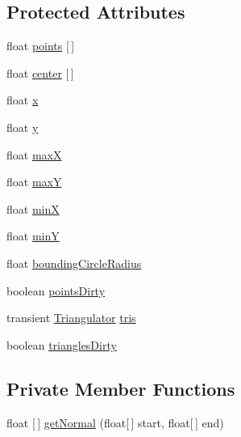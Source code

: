 \subsection*{Protected Attributes}
\begin{DoxyCompactItemize}
\item 
float \mbox{\hyperlink{classorg_1_1newdawn_1_1slick_1_1geom_1_1_shape_a8b4d4058734bbb3b96072e470b92aa37}{points}} \mbox{[}$\,$\mbox{]}
\item 
float \mbox{\hyperlink{classorg_1_1newdawn_1_1slick_1_1geom_1_1_shape_a15ecde3336c4310cd927d766bb9a0b3b}{center}} \mbox{[}$\,$\mbox{]}
\item 
float \mbox{\hyperlink{classorg_1_1newdawn_1_1slick_1_1geom_1_1_shape_a3e985bfff386c15a4efaad03d8ad60d3}{x}}
\item 
float \mbox{\hyperlink{classorg_1_1newdawn_1_1slick_1_1geom_1_1_shape_a9f934baded6a1b65ebb69e7e5f80ea00}{y}}
\item 
float \mbox{\hyperlink{classorg_1_1newdawn_1_1slick_1_1geom_1_1_shape_a8c820b5a7df465beab7f021cdd09b826}{maxX}}
\item 
float \mbox{\hyperlink{classorg_1_1newdawn_1_1slick_1_1geom_1_1_shape_aaacbabfb1b7d0653f59658d92ded1c2b}{maxY}}
\item 
float \mbox{\hyperlink{classorg_1_1newdawn_1_1slick_1_1geom_1_1_shape_a5bd07629e85d4a15fc03e3d60edb7c03}{minX}}
\item 
float \mbox{\hyperlink{classorg_1_1newdawn_1_1slick_1_1geom_1_1_shape_a4794592d5238a8c51d9d8ac4a11e68d4}{minY}}
\item 
float \mbox{\hyperlink{classorg_1_1newdawn_1_1slick_1_1geom_1_1_shape_ac89bf2b9c93a7294b49797fc7a054c11}{bounding\+Circle\+Radius}}
\item 
boolean \mbox{\hyperlink{classorg_1_1newdawn_1_1slick_1_1geom_1_1_shape_a61fe1954d2fdefc72c34b284f4fcfdb4}{points\+Dirty}}
\item 
transient \mbox{\hyperlink{interfaceorg_1_1newdawn_1_1slick_1_1geom_1_1_triangulator}{Triangulator}} \mbox{\hyperlink{classorg_1_1newdawn_1_1slick_1_1geom_1_1_shape_abd907aa2c7a270db435ed15ce6d090da}{tris}}
\item 
boolean \mbox{\hyperlink{classorg_1_1newdawn_1_1slick_1_1geom_1_1_shape_a9300b64ed3c260451f38151305e7c85e}{triangles\+Dirty}}
\end{DoxyCompactItemize}
\subsection*{Private Member Functions}
\begin{DoxyCompactItemize}
\item 
float \mbox{[}$\,$\mbox{]} \mbox{\hyperlink{classorg_1_1newdawn_1_1slick_1_1geom_1_1_shape_a936576628017b9a678f6e9db9c194a28}{get\+Normal}} (float\mbox{[}$\,$\mbox{]} start, float\mbox{[}$\,$\mbox{]} end)
\end{DoxyCompactItemize}


